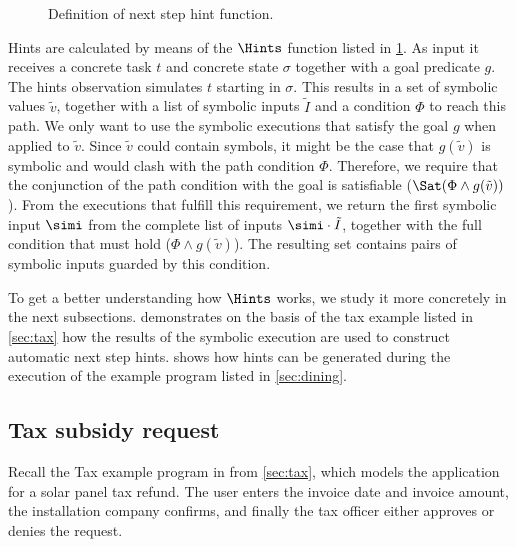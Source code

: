 \begin{figure}
  \centering
  \caption{Definition of next step hint function.}
  \label{fig:hints}
\end{figure}

Hints are calculated by means of the $\Hints$ function listed in \cref{fig:hints}.
As input it receives a concrete task $t$ and concrete state $\sigma$ together with a goal predicate $g$.
The hints observation simulates $t$ starting in $\sigma$.
This results in a set of symbolic values $\tilde{v}$, together with a list of symbolic inputs $\tilde{I}$ and a condition $\Phi$ to reach this path.
We only want to use the symbolic executions that satisfy the goal $g$ when applied to $\tilde{v}$.
Since $\tilde{v}$ could contain symbols, it might be the case that $g(\tilde{v})$ is symbolic and would clash with the path condition $\Phi$.
Therefore, we require that the conjunction of the path condition with the goal is satisfiable ($\Sat(\Phi\land g(\tilde{v}))$).
From the executions that fulfill this requirement, we return the first symbolic input $\simi$ from the complete list of inputs $\simi\cdot\tilde{I}$,
together with the full condition that must hold ($\Phi\land g(\tilde{v})$).
The resulting set contains pairs of symbolic inputs guarded by this condition.

To get a better understanding how $\Hints$ works,
we study it more concretely in the next subsections.
 demonstrates on the basis of the tax example listed in \cref{sec:tax} how the results of the symbolic execution are used to construct automatic next step hints.
 shows how hints can be generated during the execution of the example \TOPHAT program listed in \cref{sec:dining}.


\subsection{Tax subsidy request}
\label{sub:assistive-tax}

Recall the Tax example program in \TOPHAT from \cref{sec:tax},
which models the application for a solar panel tax refund.
The user enters the invoice date and invoice amount, the installation company confirms, and finally the tax officer either approves or denies the request.

